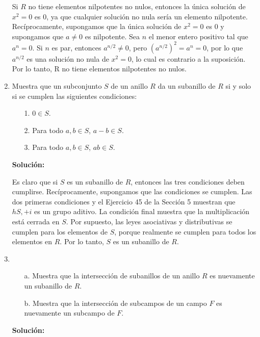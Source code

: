 \begin{enumerate}
	Si $R$ no tiene elementos nilpotentes no nulos, entonces la única solución de $x^2 = 0$ es $0$, ya que cualquier solución no nula sería un elemento nilpotente. Recíprocamente, supongamos que la única solución de $x^2 = 0$ es $0$ y supongamos que $a \neq 0$ es nilpotente. Sea $n$ el menor entero positivo tal que $a^n = 0$. Si $n$ es par, entonces $a^{n/2} \neq 0$, pero $(a^{n/2})^2 = a^n = 0$, por lo que $a^{n/2}$ es una solución no nula de $x^2 = 0$, lo cual es contrario a la suposición. Por lo tanto, R no tiene elementos nilpotentes no nulos.
	\item  Muestra que un subconjunto $S$ de un anillo $R$ da un subanillo de $R$ si y solo si se cumplen las siguientes condiciones:
	\begin{itemize}
		\item[1.] $0 \in S$.
		\item[2.] Para todo $a, b \in S$, $a - b \in S$.
		\item[3.] Para todo $a, b \in S$, $ab \in S$.
	\end{itemize}
	\textbf{Solución:}
	
	Es claro que si $S$ es un subanillo de $R$, entonces las tres condiciones deben cumplirse. Recíprocamente, supongamos que las condiciones se cumplen. Las dos primeras condiciones y el Ejercicio 45 de la Sección 5 muestran que $hS, +i$ es un grupo aditivo. La condición final muestra que la multiplicación está cerrada en $S$. Por supuesto, las leyes asociativas y distributivas se cumplen para los elementos de $S$, porque realmente se cumplen para todos los elementos en $R$. Por lo tanto, $S$ es un subanillo de $R$.
	
	\item 	
	\begin{itemize}
		\item[a.] Muestra que la intersección de subanillos de un anillo $R$ es nuevamente un subanillo de $R$.
		\item[b.] Muestra que la intersección de subcampos de un campo $F$ es nuevamente un subcampo de $F$.
	\end{itemize}
	\textbf{Solución:}
	

\end{enumerate}
